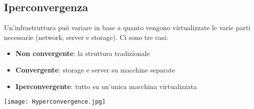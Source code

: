 \subsection{Iperconvergenza}
Un'infrastruttura può variare in base a quanto vengono virtualizzate le varie parti necessarie (network, server e storage). Ci sono tre casi:
\begin{itemize}
	\item \textbf{Non convergente}: la struttura tradizionale
	\item \textbf{Convergente}: storage e server su macchine separate
	\item \textbf{Iperconvergente}: tutto su un'unica macchina virtualizzata
\end{itemize}
\begin{center}
	\texttt{[image: Hyperconvergence.jpg]}
\end{center}